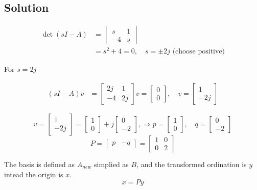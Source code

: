 \documentclass[12pt,a4paper]{article}
\begin{document}
\subsection*{Solution}

\begin{align*}
	\det (sI - A) &= \begin{vmatrix}
		s & 1 \\ -4 & s
	\end{vmatrix} \\ &= s^2 + 4 = 0, \quad s = \pm 2j \text{  (choose positive)}
\end{align*}

For $s = 2j$

\begin{align*}
	(sI - A)v &= \begin{bmatrix}
		2j & 1 \\ -4 & 2j
	\end{bmatrix}v = \begin{bmatrix}
	0 \\ 0
	\end{bmatrix}, \quad v = \begin{bmatrix}
	1 \\ -2j
	\end{bmatrix}
\end{align*}

\[
v = \begin{bmatrix}
	1 \\ -2j
\end{bmatrix} = \begin{bmatrix}
1 \\ 0 
\end{bmatrix} + j \begin{bmatrix}
0 \\ -2
\end{bmatrix}, \Rightarrow p = \begin{bmatrix}
1 \\ 0
\end{bmatrix}, \quad q = \begin{bmatrix}
0 \\ -2
\end{bmatrix}
\]
\[
P = \begin{bmatrix}
	p & -q
\end{bmatrix} = \begin{bmatrix}
1 & 0 \\ 0 & 2
\end{bmatrix}
\]

The basis is defined as $A_{new}$ simplied as $B$, and the transformed ordination is $y$ intead the origin is $x$.
\[
x = Py
\]
\end{document}
